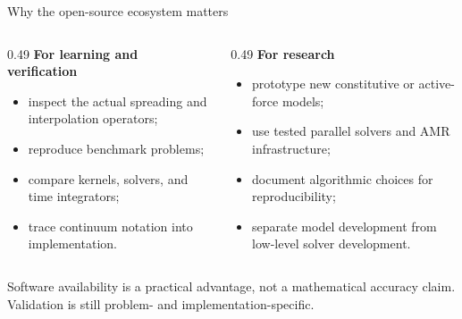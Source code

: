 \documentclass[aspectratio=169,11pt]{beamer}
\begin{document}
\begin{frame}{Why the open-source ecosystem matters}
\begin{columns}[T,onlytextwidth]
\begin{column}{0.49\textwidth}
\textbf{For learning and verification}
\begin{itemize}\itemsep6pt
  \item inspect the actual spreading and interpolation operators;
  \item reproduce benchmark problems;
  \item compare kernels, solvers, and time integrators;
  \item trace continuum notation into implementation.
\end{itemize}
\end{column}
\begin{column}{0.49\textwidth}
\textbf{For research}
\begin{itemize}\itemsep6pt
  \item prototype new constitutive or active-force models;
  \item use tested parallel solvers and AMR infrastructure;
  \item document algorithmic choices for reproducibility;
  \item separate model development from low-level solver development.
\end{itemize}
\end{column}
\end{columns}
\begin{punchbox}
\small Software availability is a practical advantage, not a mathematical accuracy claim. Validation is still problem- and implementation-specific.
\end{punchbox}
\end{frame}
\end{document}
